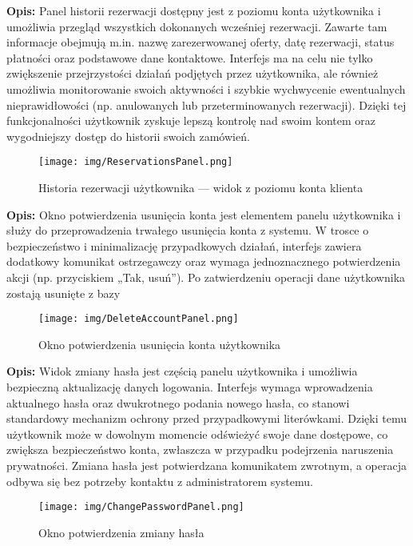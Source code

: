 \noindent
{\small \textbf{Opis:} Panel historii rezerwacji dostępny jest z poziomu konta użytkownika i umożliwia przegląd wszystkich dokonanych wcześniej rezerwacji. Zawarte tam informacje obejmują m.in. nazwę zarezerwowanej oferty, datę rezerwacji, status płatności oraz podstawowe dane kontaktowe. Interfejs ma na celu nie tylko zwiększenie przejrzystości działań podjętych przez użytkownika, ale również umożliwia monitorowanie swoich aktywności i szybkie wychwycenie ewentualnych nieprawidłowości (np. anulowanych lub przeterminowanych rezerwacji). Dzięki tej funkcjonalności użytkownik zyskuje lepszą kontrolę nad swoim kontem oraz wygodniejszy dostęp do historii swoich zamówień.}
\begin{figure}[H]
    \centering
    \texttt{[image: img/ReservationsPanel.png]}
    \caption{Historia rezerwacji użytkownika — widok z poziomu konta klienta}
    \label{fig:user_reservations_gui}
\end{figure}

\noindent
{\small \textbf{Opis:} Okno potwierdzenia usunięcia konta jest elementem panelu użytkownika i służy do przeprowadzenia trwałego usunięcia konta z systemu. W trosce o bezpieczeństwo i minimalizację przypadkowych działań, interfejs zawiera dodatkowy komunikat ostrzegawczy oraz wymaga jednoznacznego potwierdzenia akcji (np. przyciskiem „Tak, usuń”). Po zatwierdzeniu operacji dane użytkownika zostają usunięte z bazy}
\begin{figure}[H]
    \centering
    \texttt{[image: img/DeleteAccountPanel.png]}
    \caption{Okno potwierdzenia usunięcia konta użytkownika}
    \label{fig:delete_account_gui}
\end{figure}

\noindent
{\small \textbf{Opis:} Widok zmiany hasła jest częścią panelu użytkownika i umożliwia bezpieczną aktualizację danych logowania. Interfejs wymaga wprowadzenia aktualnego hasła oraz dwukrotnego podania nowego hasła, co stanowi standardowy mechanizm ochrony przed przypadkowymi literówkami. Dzięki temu użytkownik może w dowolnym momencie odświeżyć swoje dane dostępowe, co zwiększa bezpieczeństwo konta, zwłaszcza w przypadku podejrzenia naruszenia prywatności. Zmiana hasła jest potwierdzana komunikatem zwrotnym, a operacja odbywa się bez potrzeby kontaktu z administratorem systemu.}
\begin{figure}[H]
    \centering
    \texttt{[image: img/ChangePasswordPanel.png]}
    \caption{Okno potwierdzenia zmiany hasła}
    \label{fig:delete_account_gui}
\end{figure}

